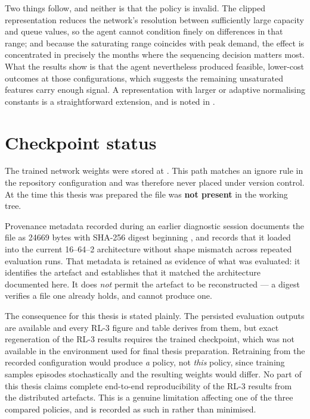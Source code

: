 Two things follow, and neither is that the policy is invalid. The clipped representation reduces
the network's resolution between sufficiently large capacity and queue values, so the agent
cannot condition finely on differences in that range; and because the saturating range coincides
with peak demand, the effect is concentrated in precisely the months where the sequencing
decision matters most. What the results show is that the agent nevertheless produced feasible,
lower-cost outcomes at those configurations, which suggests the remaining unsaturated features
carry enough signal. A representation with larger or adaptive normalising constants is a
straightforward extension, and is noted in .

\section{Checkpoint status}

The trained network weights were stored at . This path matches an
ignore rule in the repository configuration and was therefore never placed under version
control. At the time this thesis was prepared the file was \textbf{not present} in the working
tree.

Provenance metadata recorded during an earlier diagnostic session documents the file as
\num{24669} bytes with SHA-256 digest beginning , and records that it
loaded into the current 16--64--2 architecture without shape mismatch across repeated evaluation
runs. That metadata is retained as evidence of what was evaluated: it identifies the artefact
and establishes that it matched the architecture documented here. It does \emph{not} permit the
artefact to be reconstructed --- a digest verifies a file one already holds, and cannot produce
one.

The consequence for this thesis is stated plainly. The persisted evaluation outputs are
available and every RL-3 figure and table derives from them, but exact regeneration of the RL-3
results requires the trained checkpoint, which was not available in the environment used for
final thesis preparation. Retraining from the recorded configuration would produce \emph{a}
policy, not \emph{this} policy, since training samples episodes stochastically and the resulting
weights would differ. No part of this thesis claims complete end-to-end reproducibility of the
RL-3 results from the distributed artefacts. This is a genuine limitation affecting one of the
three compared policies, and is recorded as such in  rather than
minimised.
